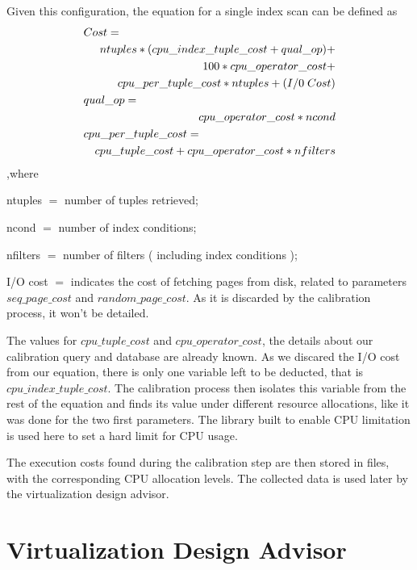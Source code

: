 Given this configuration, the equation for a single index scan can be defined as
\begin{eqnarray*}
  \lefteqn{Cost=} \\
  &&ntuples * ( cpu\_index\_tuple\_cost + qual\_op ) + \\
  &&100*cpu\_operator\_cost + \\
  &&cpu\_per\_tuple\_cost * ntuples + ( I/0\;Cost ) \\
  \lefteqn{qual\_op=} \\
  &&cpu\_operator\_cost * ncond \\
  \lefteqn{cpu\_per\_tuple\_cost=} \\
  &&cpu\_tuple\_cost + cpu\_operator\_cost * nfilters
\end{eqnarray*}
,where
\begin{description}
 \item ntuples $=$ number of tuples retrieved;
 \item ncond $=$ number of index conditions;
 \item nfilters $=$ number of filters ( including index conditions );
 \item I/O cost $=$ indicates the cost of fetching pages from disk, related to parameters $seq\_page\_cost$ and $random\_page\_cost$. As it is discarded by the calibration process, it won't be detailed.
\end{description}

The values for $cpu\_tuple\_cost$ and $cpu\_operator\_cost$, the details about our calibration query and database are already known. As we discared the I/O cost from our equation, there is only one variable left to be deducted, that is $cpu\_index\_tuple\_cost$. The calibration process then isolates this variable from the rest of the equation and finds its value under different resource allocations, like it was done for the two first parameters. The library built to enable CPU limitation is used here to set a hard limit for CPU usage.

The execution costs found during the calibration step are then stored in files, with the corresponding CPU allocation levels. The collected data is used later by the virtualization design advisor. 

\section{Virtualization Design Advisor}

